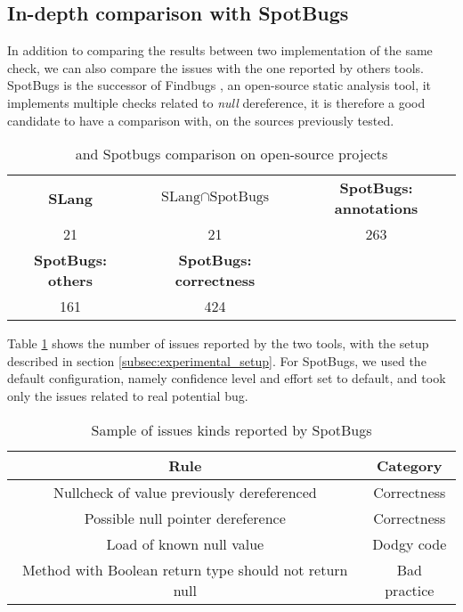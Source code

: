\subsection{In-depth comparison with SpotBugs}
\label{subsec:indpeth_comparison_spotbugs}

In addition to comparing the results between two implementation of the same check, we can also compare the issues with the one reported by others tools.
SpotBugs \cite{spotBugs:2019:Online} is the successor of Findbugs \cite{FindBugs:2019:Online}, an open-source static analysis tool, it implements multiple checks related to \emph{null} dereference, it is therefore a good candidate to have a comparison with, on the sources previously tested.

\begin{table}[h]
	\centering
	\caption{\slang{} and Spotbugs comparison on open-source projects}
	\label{table:slang_vs_spotbugs}
	\begin{tabular}{|c|c|c|}
		\hline
		\bf SLang & \bf $\text{SLang} \cap \text{SpotBugs}$ & \bf SpotBugs: annotations \\
		21 & 21 & 263 \\ \hline
		\bf SpotBugs: others & \bf SpotBugs: correctness & \\ 
		161 & 424 &  \\ \hline
	\end{tabular}
\end{table}

Table \ref{table:slang_vs_spotbugs} shows the number of issues reported by the two tools, with the setup described in section \ref{subsec:experimental_setup}. 
For SpotBugs, we used the default configuration, namely confidence level and effort set to default, and took only the issues related to real potential bug.

\begin{table}[h]
	\centering
	\caption{Sample of issues kinds reported by SpotBugs}
	\label{table:spotbugs-rules}
	\begin{tabular}{|c|c|}
		\hline
		\bf Rule & \bf Category\\ \hline
		Nullcheck of value previously dereferenced & Correctness  \\
		Possible null pointer dereference & Correctness  \\
		Load of known null value & Dodgy code \\
		Method with Boolean return type should not return null & Bad practice \\ \hline
	\end{tabular}
\end{table}

